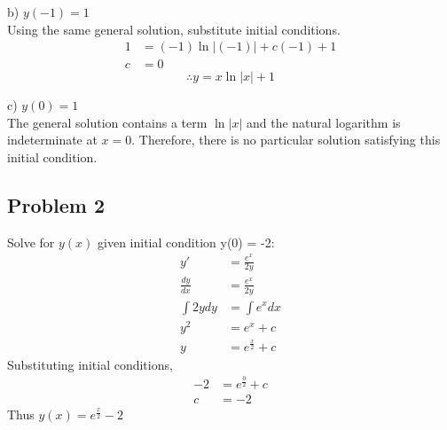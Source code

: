 \documentclass[titlepage]{article}
\begin{document}
\noindent
b) $y (-1) = 1$
\\ Using the same general solution, substitute initial conditions.
\begin{align*}
1 &= (-1)\ln \left| (-1) \right| + c(-1) + 1
\\ c &= 0
\end{align*}
$$ \therefore y = x\ln \left| x \right| + 1 $$

\noindent
c) $y (0) = 1$
\\ The general solution contains a term $\ln \left| x \right|$ and the natural logarithm is indeterminate at $x=0$. Therefore, there is no particular solution satisfying this initial condition.


\subsection{Problem 2}
Solve for $y(x)$ given initial condition y(0) = -2:
\begin{align*}
y' &= \frac{e^x}{2y}
\\ \frac{dy}{dx} &= \frac{e^x}{2y}
\\ \int 2y dy &= \int e^x dx
\\ y^2 &= e^x + c
\\ y &= e^{\frac{x}{2}} + c
\end{align*}
Substituting initial conditions,
\begin{align*}
-2 &= e^{\frac{0}{2}} + c
\\ c &= -2
\end{align*}
Thus $y(x) = e^{\frac{x}{2}} - 2$
\end{document}
